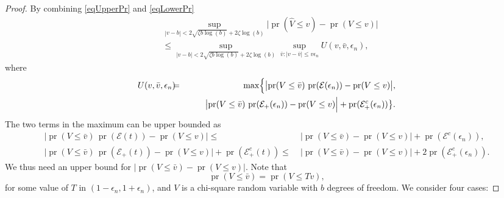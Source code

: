 \documentclass[10pt, reqno]{amsart}
\numberwithin{equation}{section}
\newcommand{\pr}{\mathop{\mathrm{pr}}}
\begin{document}
\begin{appendix}
\begin{proof}
	By combining \eqref{eqUpperPr} and \eqref{eqLowerPr} 
	\begin{align*}   
		&\sup_{|v - b| <   2\sqrt{\zeta b\log(b)} + 2\zeta\log(b)}\bigl|\pr(\hat V \leq v) - \pr(V \leq v)\bigr| \\
		&\leq \sup_{|v - b| <   2\sqrt{\zeta b\log(b)} + 2\zeta\log(b)}\sup_{\bar v:|v-\bar v|\leq v\epsilon_n} U(v,\bar v,\epsilon_n),
	\end{align*}
	where 
	\begin{eqnarray*}
		U(v,\bar v,\epsilon_n) \hspace{-0.2cm} &=& \hspace{-0.2cm} \max\Bigl\{ \bigl|\pr(V\leq \bar v)\,\pr(\mathcal{E}(\epsilon_n)) - \pr(V \leq v) \bigr|, \\
		& &  \quad \quad \bigl|\pr(V\leq \bar v)\,\pr(\mathcal{E}_{+}(\epsilon_n)) - \pr(V \leq v) \Bigr| + \pr(\mathcal{E}_{+}^c(\epsilon_n))\bigr\}.
	\end{eqnarray*}
	The two terms in the maximum can be upper bounded as
	\begin{align*}
		\bigl|\pr(V\leq \bar v)\,\pr(\mathcal{E}(t)) - \pr(V \leq v) \bigr| \leq & \; \bigl|\pr(V\leq \bar v) - \pr(V \leq v) \bigr| + \pr(\mathcal{E}^c(\epsilon_n)), \\
		\bigl|\pr(V\leq \bar v)\,\pr(\mathcal{E}_{+}(t)) - \pr(V \leq v) \Bigr| + \pr(\mathcal{E}_{+}^c(t)) \leq & \; \bigl|\pr(V\leq \bar v) - \pr(V \leq v) \Bigr| + 2\pr(\mathcal{E}_{+}^c(\epsilon_n)).
	\end{align*}
	We thus need an upper bound for $|\pr(V\leq \bar v) - \pr(V \leq v)|$.
	Note that
	\[
	\pr( V \leq \bar{v}) = \pr\left( V \leq Tv \right), 
	\]
	for some value of $T$ in $(1 - \epsilon_n, 1 + \epsilon_n)$, and $V$ is a chi-square random variable with $b$ degrees of freedom. We consider four cases: 
	

\end{proof}
\end{appendix}
\end{document}
